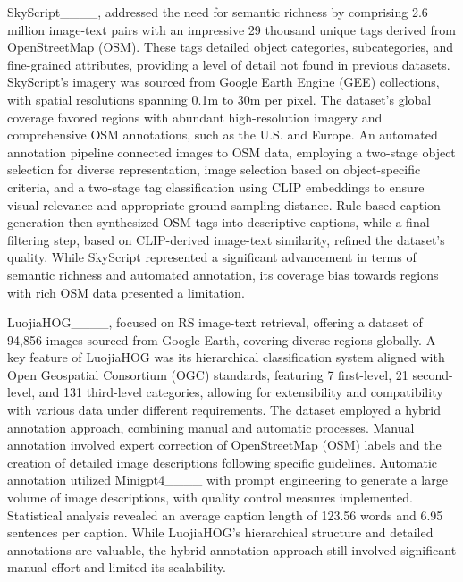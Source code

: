 SkyScript____, addressed the need for semantic richness by comprising 2.6 million image-text pairs with an impressive 29 thousand unique tags derived from OpenStreetMap (OSM). These tags detailed object categories, subcategories, and fine-grained attributes, providing a level of detail not found in previous datasets. SkyScript's imagery was sourced from Google Earth Engine (GEE) collections, with spatial resolutions spanning 0.1m to 30m per pixel. The dataset's global coverage favored regions with abundant high-resolution imagery and comprehensive OSM annotations, such as the U.S. and Europe. An automated annotation pipeline connected images to OSM data, employing a two-stage object selection for diverse representation, image selection based on object-specific criteria, and a two-stage tag classification using CLIP embeddings to ensure visual relevance and appropriate ground sampling distance. Rule-based caption generation then synthesized OSM tags into descriptive captions, while a final filtering step, based on CLIP-derived image-text similarity, refined the dataset's quality. While SkyScript represented a significant advancement in terms of semantic richness and automated annotation, its coverage bias towards regions with rich OSM data presented a limitation.

LuojiaHOG____, focused on RS image-text retrieval, offering a dataset of 94,856 images sourced from Google Earth, covering diverse regions globally. A key feature of LuojiaHOG was its hierarchical classification system aligned with Open Geospatial Consortium (OGC) standards, featuring 7 first-level, 21 second-level, and 131 third-level categories, allowing for extensibility and compatibility with various data under different requirements. The dataset employed a hybrid annotation approach, combining manual and automatic processes. Manual annotation involved expert correction of OpenStreetMap (OSM) labels and the creation of detailed image descriptions following specific guidelines. Automatic annotation utilized Minigpt4____ with prompt engineering to generate a large volume of image descriptions, with quality control measures implemented. Statistical analysis revealed an average caption length of 123.56 words and 6.95 sentences per caption. While LuojiaHOG's hierarchical structure and detailed annotations are valuable, the hybrid annotation approach still involved significant manual effort and limited its scalability.

